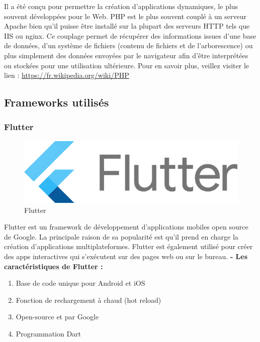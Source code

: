 Il a été conçu pour permettre la création d'applications dynamiques, le plus souvent développées pour le Web. PHP est le plus souvent couplé à un serveur Apache bien qu'il puisse être installé sur la plupart des serveurs HTTP tels que IIS ou nginx. Ce couplage permet de récupérer des informations issues d'une base de données, d'un système de fichiers (contenu de fichiers et de l'arborescence) ou plus simplement des données envoyées par le navigateur afin d'être interprétées ou stockées pour une utilisation ultérieure.
\newline Pour en savoir plus, veillez
visiter le lien : \href{https://fr.wikipedia.org/wiki/PHP}{https://fr.wikipedia.org/wiki/PHP}
\subsection{Frameworks utilisés}

\subsubsection{Flutter}
\begin{figure}[h]
	\includegraphics[scale=0.3]{./Template LaTeX/Images/Flutter.png}
	\centering
	\caption{Flutter}
\end{figure}
Flutter est un framework de développement d’applications mobiles open source de Google. La principale raison de sa popularité est qu’il prend en charge la création 		   
d’applications multiplateformes. Flutter est également utilisé pour créer des apps interactives qui s’exécutent sur des pages web ou sur le bureau.\newline
\textbf {- Les caractéristiques de Flutter :}


\begin{enumerate}
	\item Base de code unique pour Android et iOS
	\item Fonction de rechargement à chaud (hot reload)
	\item Open-source et par Google
	\item Programmation Dart \newline \newline \newline
\end{enumerate}


